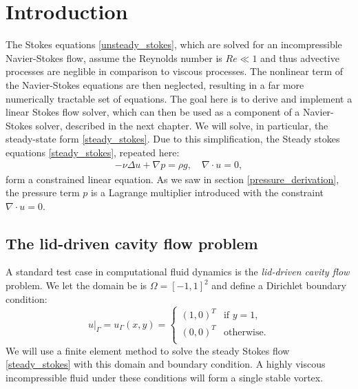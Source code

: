 \section{Introduction}
The Stokes equations \eqref{unsteady_stokes}, which are solved for an incompressible Navier-Stokes flow,
assume the Reynolds number is $Re \ll 1$ and thus advective processes are neglible in comparison to viscous processes.
The nonlinear term of the Navier-Stokes equations are then neglected, resulting in a far more numerically tractable set of equations.
The goal here is to derive and implement a linear Stokes flow solver, which can then be used as a component of a Navier-Stokes solver,
described in the next chapter.
We will solve, in particular, the steady-state form \eqref{steady_stokes}.
Due to this simplification, the Steady stokes equations \eqref{steady_stokes}, repeated here:
\begin{align*}
    -\nu\Delta u + \nabla p = \rho g, \quad \nabla\cdot u = 0,
\end{align*}
form a constrained linear equation. As we saw in section \ref{pressure_derivation}, the pressure term $p$ is a Lagrange multiplier introduced
with the constraint $\nabla\cdot u = 0$.

\subsection{The lid-driven cavity flow problem}
A standard test case in computational fluid dynamics is the \textit{lid-driven cavity flow} problem.
We let the domain be is $\Omega = [-1,1]^2$ and define a Dirichlet boundary condition:
\begin{equation}\label{lid_driven_boundary_condition}
    \left.u\right|_\Gamma = u_\Gamma(x,y) =
    \left\{\begin{array}{lr}
        \left(1, 0\right)^T &\text{if $y = 1$,}\\
        \left(0, 0\right)^T &\text{otherwise}.\\
        \end{array}\right.
\end{equation}
We will use a finite element method to solve the steady Stokes flow \eqref{steady_stokes} with this domain and boundary condition. A highly viscous incompressible
fluid under these conditions will form a single stable vortex.

